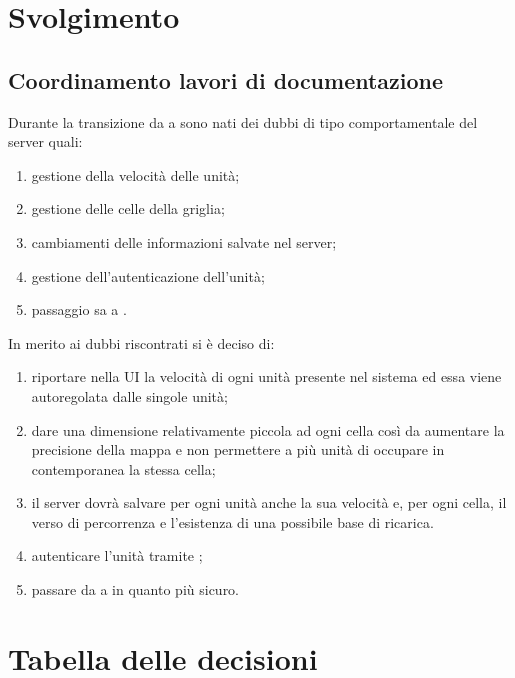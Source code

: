 \documentclass[]{article}
\begin{document}
	\newpage

	\section{Svolgimento}
		\subsection{Coordinamento lavori di documentazione}
		Durante la transizione da  a  sono nati dei dubbi di tipo comportamentale del server quali:
		\begin{enumerate} 
			\item gestione della velocità delle unità;
			\item gestione delle celle della griglia;
			\item cambiamenti delle informazioni salvate nel server;
			\item gestione dell'autenticazione dell'unità;
			\item passaggio sa  a .
		\end{enumerate}
		In merito ai dubbi riscontrati si è deciso di:
		\begin{enumerate}
			\item riportare nella UI la velocità di ogni unità presente nel sistema ed essa viene autoregolata dalle singole unità;
			\item dare una dimensione relativamente piccola ad ogni cella così da aumentare la precisione della mappa e non permettere a più unità di occupare in contemporanea la stessa cella;
			\item il server dovrà salvare per ogni unità anche la sua velocità e, per ogni cella, il verso di percorrenza e l'esistenza di una possibile base di ricarica. 
			\item autenticare l'unità tramite ;
			\item passare da  a  in quanto più sicuro.
		\end{enumerate} 



	\newpage

	\section{Tabella delle decisioni}
\end{document}
